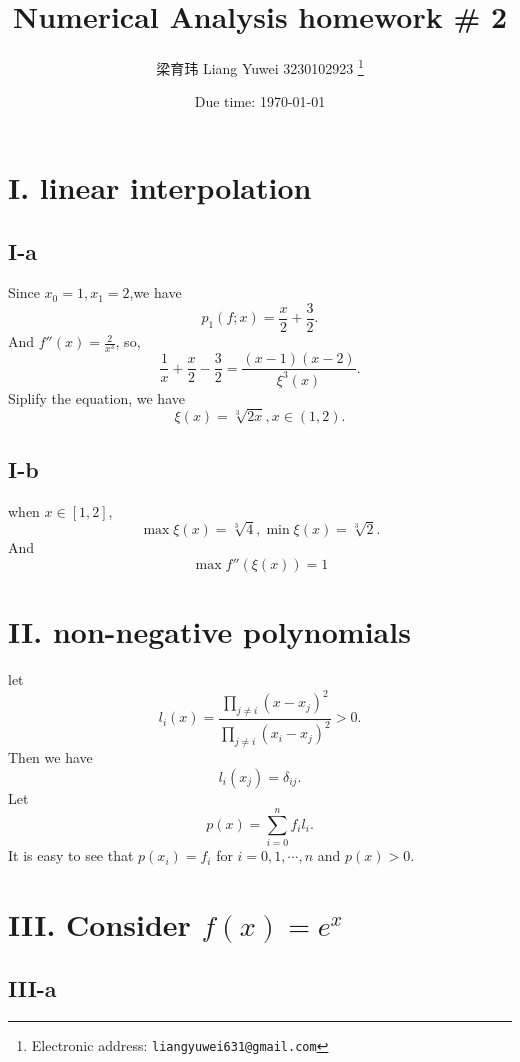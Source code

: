 \documentclass[a4paper]{article}
\begin{document}
\title{Numerical Analysis homework \# 2}

\author{梁育玮 Liang Yuwei 3230102923
  \thanks{Electronic address: \texttt{liangyuwei631@gmail.com}}}


\date{Due time: \today}

\maketitle


\section*{I. linear interpolation}

\subsection*{I-a}
Since $x_0 = 1, x_1 = 2$,we have \[
p_1(f;x) = \frac{x}{2} + \frac{3}{2} .
\]
And \(f''(x)= \frac{2}{x^3}\), so,
\[
\frac{1}{x} + \frac{x}{2} -\frac{3}{2} = \frac{(x-1)(x-2)}{\xi^3(x)}.
\]
Siplify the equation, we have \[
\xi(x) = \sqrt[3]{2x},  x \in (1, 2).
\]

\subsection*{I-b}
when $x \in [1, 2]$,
\[
\max \xi(x) = \sqrt[3]{4} , \min \xi(x)  = \sqrt[3]{2}.
\]
And \[\max f''(\xi(x)) = 1\]


\section*{II. non-negative polynomials}

let \[
l_i(x) = \frac{\prod\limits_{j \neq i} (x - x_j)^2}{\prod\limits_{j \neq i} (x_i - x_j)^2} > 0.
\]
Then we have $$l_i(x_j) = \delta_{ij}.$$
Let \[p(x) = \sum_{i = 0}^{n} f_i l_i.\]
It is easy to see that $p(x_i) = f_i$ for $i = 0, 1, \cdots, n$ and $p(x)>0$.

\section*{III. Consider $f(x) = e^x$}
\subsection*{III-a}
\end{document}
